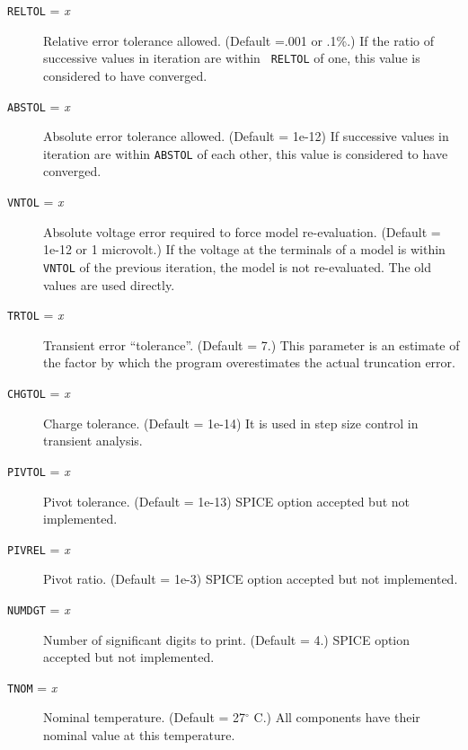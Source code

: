 \begin{description}
\item[{\tt RELTOL} = {\it x}] Relative error tolerance allowed.
(Default =.001 or .1\%.)
If the ratio of successive values in iteration are within {\tt
RELTOL} of one, this value is considered to have converged.

\item[{\tt ABSTOL} = {\it x}] Absolute error tolerance
allowed.  (Default = 1e-12)
If successive values in iteration are within {\tt ABSTOL} of
each other, this value is considered to have converged.

\item[{\tt VNTOL} = {\it x}] Absolute voltage error required to
force model re-evaluation.  (Default = 1e-12 or 1 microvolt.)
If the voltage at the terminals of a model is within {\tt
VNTOL} of the previous iteration, the model is not
re-evaluated.  The old values are used directly.

\item[{\tt TRTOL} = {\it x}] Transient error ``tolerance''.
(Default = 7.)  This parameter is an estimate of the factor by
which the program overestimates the actual truncation error.

\item[{\tt CHGTOL} = {\it x}] Charge tolerance.  (Default =
1e-14) It is used in step size control in transient analysis.

\item[{\tt PIVTOL} = {\it x}] Pivot tolerance.  (Default =
1e-13) SPICE option accepted but not implemented.

\item[{\tt PIVREL} = {\it x}] Pivot ratio.  (Default = 1e-3)
SPICE option accepted but not implemented.

\item[{\tt NUMDGT} = {\it x}] Number of significant digits to
print.  (Default = 4.)  SPICE option accepted but not
implemented.

\item[{\tt TNOM} = {\it x}] Nominal temperature.  (Default =
27$^{\circ}$ C.)
All components have their nominal value at this temperature.


\end{description}
